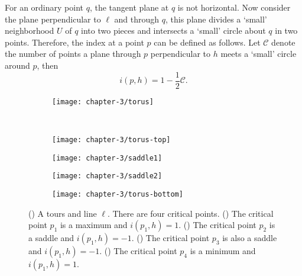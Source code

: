 For an ordinary point $q$, the tangent plane at $q$ is not horizontal. 
Now consider the plane perpendicular to $\ell$ and through $q$, this plane
divides a `small' neighborhood $U$ of $q$ into two pieces and intersects
a `small' circle about $q$ in two points.
Therefore, the index at a point $p$ can be defined as follows.
Let $\mathcal{C}$ denote the number of points a plane through $p$ perpendicular
to $h$ meets a `small' circle around $p$, then 
$$i(p,h)=1-\frac{1}{2}\mathcal{C}.$$

 \begin{figure}[htb]
         \centering
        \begin{subfigure}[b]{0.3\textwidth}
         \texttt{[image: chapter-3/torus]}
 	 \label{fig:torus-ell}
       \end{subfigure}\\
         \begin{subfigure}[b]{0.21\textwidth}
         \texttt{[image: chapter-3/torus-top]}
          \label{fig:max}
         \end{subfigure}
          \begin{subfigure}[b]{0.21\textwidth}
         \texttt{[image: chapter-3/saddle1]}
          \label{fig:saddle1}
         \end{subfigure}
         \begin{subfigure}[b]{0.21\textwidth}
         \texttt{[image: chapter-3/saddle2]}
          \label{fig:saddle2}
         \end{subfigure}
         \begin{subfigure}[b]{0.21\textwidth}
         \texttt{[image: chapter-3/torus-bottom]}
         \label{fig:min}
         \end{subfigure}
		\caption{() A tours and line $\ell$. There are four critical points.
 		() The critical point $p_1$ is a maximum and $i(p_1,h)=1$.
		() The critical point $p_2$ is a saddle and $i(p_1,h)=-1$.
		() The critical point $p_3$ is also a saddle and $i(p_1,h)=-1$.
		() The critical point $p_4$ is a minimum and $i(p_1,h)=1$.
 		\label{fig:torus-total}}
 \end{figure}








